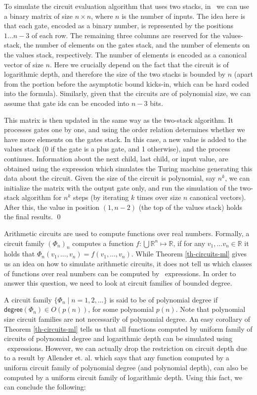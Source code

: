 To simulate the circuit evaluation algorithm that uses two stacks, in \langfor\ we can use a binary matrix of size $n\times n$, where $n$ is the number of inputs. The idea here is that each gate, encoded as a binary number, is represented by the positions $1\ldots n-3$ of each row. The remaining three columns are reserved for the values-stack, the number of elements on the gates stack, and the number of elements on the values stack, respectively. The number of elements is encoded as a canonical vector of size $n$. Here we crucially depend on the fact that the circuit is of logarithmic depth, and therefore the size of the two stacks is bounded by $n$ (apart from the portion before the asymptotic bound kicks-in, which can be hard coded into the formula). Similarly, given that the circuits are of polynomial size, we can assume that gate ids can be encoded into $n-3$ bits.

This matrix is then updated in the same way as the two-stack algorithm. It processes gates one by one, and using the order relation determines whether we have more elements on the gates stack. In this case, a new value is added to the values stack (0 if the gate is a plus gate, and 1 otherwise), and the process continues. Information about the next child, last child, or input value, are obtained using the expression which simulates the Turing machine generating this data about the circuit. Given the size of the circuit is polynomial, say $n^k$, we can initialize the matrix with the output gate only, and run the simulation of the two-stack algorithm for $n^k$ steps (by iterating $k$ times over size $n$ canonical vectors). After this, the value in position  $(1,n-2)$ (the top of the values stack) holds the final results. \qed

\smallskip

Arithmetic circuits are used to compute functions over real numbers. Formally, a circuit family $(\Phi_n)_n$ computes a function $f:\bigcup \mathbb{R}^n\mapsto\mathbb{R}$, if for any $v_1,\ldots v_n\in \mathbb{R}$ it holds that $\Phi_n(v_1,\ldots ,v_n) = f(v_1,\ldots ,v_n)$. While Theorem \ref{th-circuits-ml} gives us an idea on how to simulate arithmetic circuits, it does not tell us which classes of functions over real numbers can be computed by \langfor\ expressions. In order to answer this question, we need to look at circuit families of bounded degree. 

A circuit family $\{\Phi_n\mid n=1,2,\ldots\}$ is said to be of polynomial degree if $\mathsf{degree}(\Phi_n)\in O(p(n))$, for some polynomial $p(n)$. Note that polynomial size circuit families are not necessarily of polynomial degree. An easy corollary of Theorem \ref{th-circuits-ml} tells us that all functions computed by uniform family of circuits of polynomial degree and logarithmic depth can be simulated using \langfor\ expressions. However, we can actually drop the restriction on circuit depth due to a result by Allender et. al. \cite{AllenderJMV98} which says that any function computed by a uniform circuit family of polynomial degree (and polynomial depth), can also be computed by a uniform circuit family of logarithmic depth. Using this fact, we can conclude the following:

